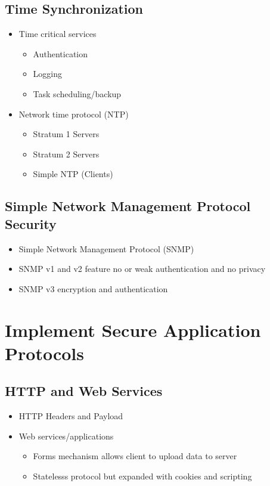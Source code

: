 	\subsection {Time Synchronization}
		\begin{itemize}
			\item Time critical services
				\begin{itemize}
					\item Authentication
					\item Logging
					\item Task scheduling/backup
				\end{itemize}
			\item Network time protocol (NTP)
				\begin{itemize}
					\item Stratum 1 Servers
					\item Stratum 2 Servers
					\item Simple NTP (Clients)
				\end{itemize}
		\end{itemize}
	\subsection {Simple Network Management Protocol Security}
		\begin{itemize}
			\item Simple Network Management Protocol (SNMP)
			\item SNMP v1 and v2 feature no or weak authentication and no privacy
			\item SNMP v3 encryption and authentication
		\end{itemize}

\section {Implement Secure Application Protocols}
	\subsection {HTTP and Web Services}
		\begin{itemize}
			\item HTTP Headers and Payload
			\item Web services/applications
				\begin{itemize}
					\item Forms mechanism allows client to upload data to server
					\item Statelesss protocol but expanded with cookies and scripting
				\end{itemize}
		\end{itemize}
